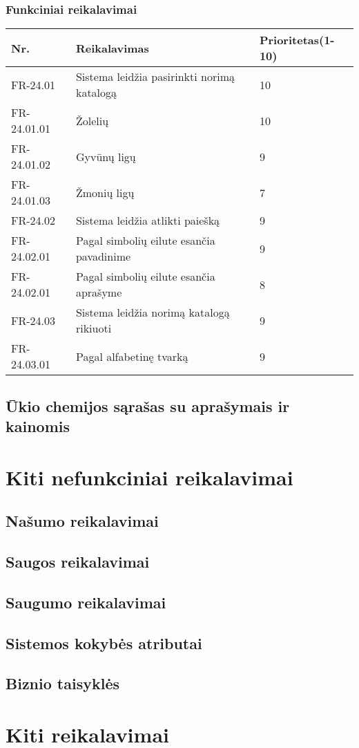 \documentclass[oneside]{VUMIFPSkursinis}
\begin{document}
	\subsubsection{Funkciniai reikalavimai}
	\begin{table}[htbp]
		\begin{tabularx}{1\textwidth}{ |P{2.5cm}|X|P{3cm }| }  \hline
			Nr. & Reikalavimas & Prioritetas(1-10) \\ \hline
			FR-24.01 & Sistema leidžia pasirinkti norimą katalogą & 10 \\ \hline
			FR-24.01.01 & Žolelių & 10 \\ \hline
			FR-24.01.02 & Gyvūnų ligų & 9 \\ \hline
			FR-24.01.03 & Žmonių ligų & 7 \\ \hline
			FR-24.02 & Sistema leidžia atlikti paiešką  & 9 \\ \hline
			FR-24.02.01 & Pagal simbolių eilute esančia pavadinime & 9 \\ \hline
			FR-24.02.01 & Pagal simbolių eilute esančia aprašyme & 8 \\ \hline
			FR-24.03 & Sistema leidžia norimą katalogą rikiuoti & 9 \\ \hline
			FR-24.03.01 & Pagal alfabetinę tvarką  & 9 \\ \hline
		\end{tabularx}
	\end{table}
\subsection{Ūkio chemijos sąrašas su aprašymais ir kainomis}

\section{Kiti nefunkciniai reikalavimai}
\subsection{Našumo reikalavimai}
\subsection{Saugos reikalavimai}
\subsection{Saugumo reikalavimai}
\subsection{Sistemos kokybės atributai}
\subsection{Biznio taisyklės}

\section{Kiti reikalavimai}
\end{document}
